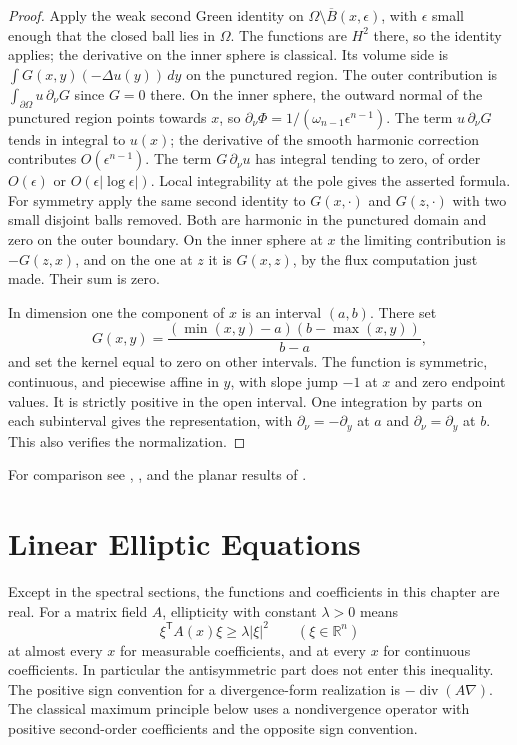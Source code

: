 \documentclass[11pt,oneside,openany]{book}
\theoremstyle{plain}
\theoremstyle{definition}
\theoremstyle{remark}
\begin{document}
\begin{proof}
Apply the weak second Green identity on
\(\Omega\setminus\overline B(x,\epsilon)\), with
\(\epsilon\) small enough that the closed ball lies in
\(\Omega\). The functions are \(H^2\) there, so the
identity applies; the derivative on the inner sphere is
classical. Its volume side is
\(\int G(x,y)(-\Delta u(y))\,dy\) on the punctured region.
The outer contribution is
\(\int_{\partial\Omega}u\,\partial_\nu G\) since \(G=0\)
there. On the inner sphere, the outward normal of the
punctured region points towards \(x\), so
\(\partial_\nu\Phi=1/(\omega_{n-1}\epsilon^{n-1})\).
The term \(u\,\partial_\nu G\) tends in integral to \(u(x)\);
the derivative of the smooth harmonic correction contributes
\(O(\epsilon^{n-1})\). The term \(G\,\partial_\nu u\)
has integral tending to zero, of order \(O(\epsilon)\) or
\(O(\epsilon|\log\epsilon|)\). Local integrability at the
pole gives the asserted formula. For symmetry apply the same
second identity to \(G(x,\cdot)\) and \(G(z,\cdot)\) with
two small disjoint balls removed. Both are harmonic in
the punctured domain and zero on the outer boundary.
On the inner sphere at \(x\) the limiting contribution is
\(-G(z,x)\), and on the one at \(z\) it is \(G(x,z)\),
by the flux computation just made. Their sum is zero.

In dimension one the component of \(x\) is an interval
\((a,b)\). There set
\[
 G(x,y)=\frac{(\min(x,y)-a)(b-\max(x,y))}{b-a},
\]
and set the kernel equal to zero on other intervals.
The function is symmetric, continuous, and piecewise affine
in \(y\), with slope jump \(-1\) at \(x\) and zero endpoint
values. It is strictly positive in the open interval.
One integration by parts on each subinterval gives
the representation, with \(\partial_\nu=-\partial_y\)
at \(a\) and \(\partial_\nu=\partial_y\) at \(b\).
This also verifies the normalization.
\end{proof}

For comparison see \cite[Sections 4.1, 6.6 and 6.8]{AG},
\cite[Sections 2.8 and 4.2]{GT}, and the planar results
of \cite[Chapter 14]{D12}.
\chapter{Linear Elliptic Equations}\label{pde:elliptic-chapter}

Except in the spectral sections, the functions and coefficients in this
chapter are real. For a matrix field \(A\), ellipticity with constant
\(\lambda>0\) means
\[
 \xi^{\mathsf T}A(x)\xi\geq \lambda|\xi|^2
 \qquad(\xi\in\mathbb R^n)
\]
at almost every \(x\) for measurable coefficients, and at every \(x\)
for continuous coefficients. In particular the antisymmetric part does
not enter this inequality. The positive sign convention for a
divergence-form realization is \(-\operatorname{div}(A\nabla)\). The
classical maximum principle below uses a nondivergence operator with
positive second-order coefficients and the opposite sign convention.
\end{document}
